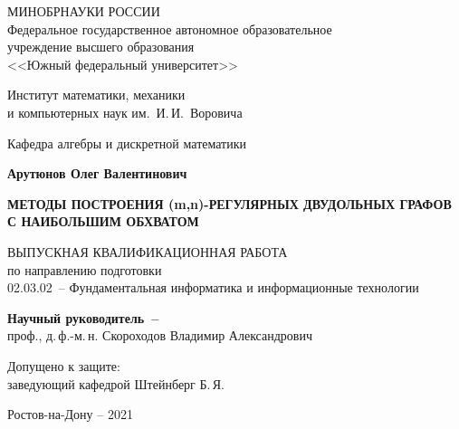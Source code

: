 


\thispagestyle{empty}
\begin{singlespacing}
\begin{center}

МИНОБРНАУКИ РОССИИ\\ [12pt]
Федеральное государственное автономное образовательное\\
учреждение высшего образования\\
<<Южный федеральный университет>>

\vspace{\baselineskip}
Институт математики, механики\\
и компьютерных наук им.~И.\,И.~Воровича

\vspace{\baselineskip}
Кафедра алгебры и дискретной математики

\vfill
\textbf{Арутюнов Олег Валентинович}

\vspace{\baselineskip}
{\bf МЕТОДЫ ПОСТРОЕНИЯ (m,n)-РЕГУЛЯРНЫХ ДВУДОЛЬНЫХ ГРАФОВ С НАИБОЛЬШИМ ОБХВАТОМ }

\vspace{15mm}
ВЫПУСКНАЯ КВАЛИФИКАЦИОННАЯ РАБОТА\\
по направлению подготовки\\
02.03.02~-- Фундаментальная информатика и информационные технологии



\vspace{10mm}
\textbf{Научный руководитель~--}\\
проф., д.\,ф.-м.\,н. Скороходов Владимир Александрович

\vspace{15mm}

\noindent
\begin{flushleft}
Допущено к защите:\\
заведующий кафедрой \underline{\hspace*{65mm}} Штейнберг Б.\,Я.
\end{flushleft}




\vfill
Ростов-на-Дону -- 2021

\end{center}

\singlespacing
\end{singlespacing} 